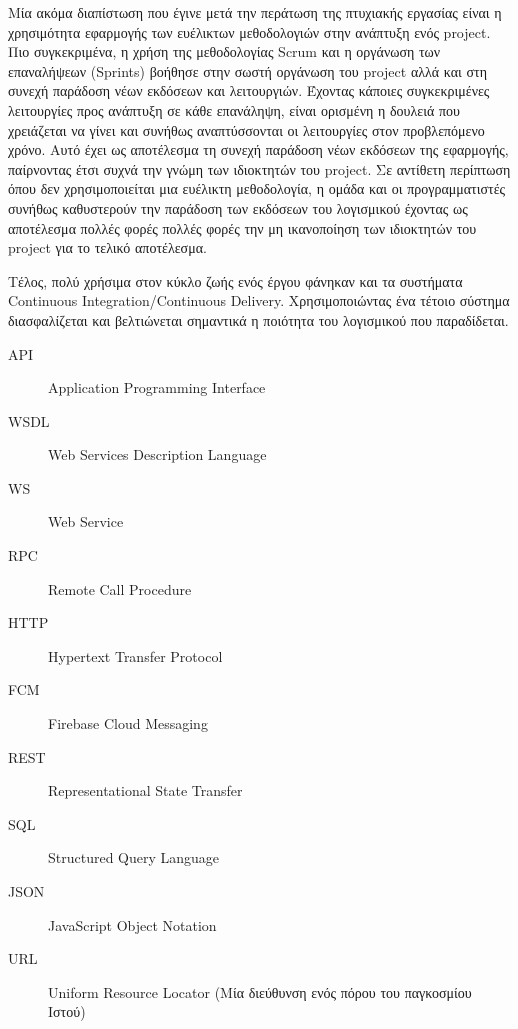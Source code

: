 \documentclass[oneside, 12pt]{book}
\begin{document}
Μία ακόμα διαπίστωση που έγινε μετά την περάτωση της πτυχιακής εργασίας είναι η χρησιμότητα εφαρμογής των ευέλικτων μεθοδολογιών στην ανάπτυξη ενός project.
Πιο συγκεκριμένα, η χρήση της μεθοδολογίας Scrum και η οργάνωση των επαναλήψεων (Sprints) βοήθησε στην σωστή οργάνωση του project αλλά και στη συνεχή παράδοση νέων εκδόσεων και λειτουργιών.
Έχοντας κάποιες συγκεκριμένες λειτουργίες προς ανάπτυξη σε κάθε επανάληψη, είναι ορισμένη η δουλειά που χρειάζεται να γίνει και συνήθως αναπτύσσονται οι λειτουργίες στον προβλεπόμενο χρόνο. Αυτό έχει ως αποτέλεσμα τη συνεχή παράδοση νέων εκδόσεων της εφαρμογής, παίρνοντας έτσι συχνά την γνώμη των ιδιοκτητών του project.
Σε αντίθετη περίπτωση όπου δεν χρησιμοποιείται μια ευέλικτη μεθοδολογία, η ομάδα και οι προγραμματιστές συνήθως καθυστερούν την παράδοση των εκδόσεων του λογισμικού έχοντας ως αποτέλεσμα πολλές φορές πολλές φορές την μη ικανοποίηση των ιδιοκτητών του project για το τελικό αποτέλεσμα.

Τέλος, πολύ χρήσιμα στον κύκλο ζωής ενός έργου φάνηκαν και τα συστήματα Continuous Integration/Continuous Delivery.
Χρησιμοποιώντας ένα τέτοιο σύστημα διασφαλίζεται και βελτιώνεται σημαντικά η ποιότητα του λογισμικού που παραδίδεται.

\begin{Glossary}
\begin{description}
\item[API] Application Programming Interface
\item[WSDL] Web Services Description Language
\item[WS] Web Service
\item[RPC] Remote Call Procedure
\item[HTTP] Hypertext Transfer Protocol
\item[FCM] Firebase Cloud Messaging
\item[REST] Representational State Transfer
\item[SQL] Structured Query Language
\item[JSON] JavaScript Object Notation  
\item[URL] Uniform Resource Locator (Μία διεύθυνση ενός πόρου του παγκοσμίου Ιστού)
\end{description}
\end{Glossary}

\printbibliography

\lastpageinfo
\end{document}
